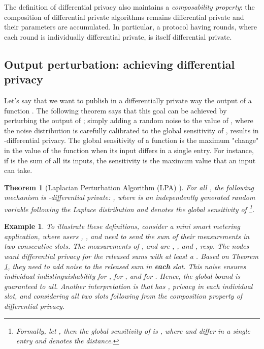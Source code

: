 \documentclass[11pt,a4paper]{article}
\theoremstyle{plain}
\theoremstyle{plain}
\newtheorem{theorem}{Theorem}
\theoremstyle{plain}
\newtheorem{example}{Example}
\theoremstyle{plain}
\theoremstyle{nonumberplain} \theoremseparator{}
\begin{document}
The definition of differential privacy also maintains a \emph{composability property}: the composition of differential private algorithms remains differential private and their  parameters are accumulated. In particular, a protocol having  rounds, where each round is individually  differential private, is itself  differential private.





\subsection{Output perturbation: achieving differential privacy}
\label{sec:perturbation}

Let's say that we want to publish in a differentially private way the output of a function .
The following theorem says that this goal can be achieved by perturbing the output of ; simply adding a random noise to the value of , where the noise distribution is carefully calibrated to the global sensitivity of , results in -differential privacy. The global sensitivity of a function is the maximum "change" in the value of the function when its input differs in a single entry. For instance, if  is the sum of all its inputs, the sensitivity is the maximum value that an input can take.


\begin{theorem}[Laplacian Perturbation Algorithm (LPA) \cite{dwork06tcc}]
\label{thm:histo}
For all , the following mechanism  is -differential private: , where  is an independently generated random variable following the Laplace distribution and  denotes the global sensitivity of \footnote{Formally, let , then the global sensitivity of  is , where  and  differ in a single entry and  denotes the  distance.}.
\end{theorem}





\begin{example}
\label{ex:1}
To illustrate these definitions, consider a mini smart metering application, where users , , and  need to send the sum of their measurements in two consecutive slots. The measurements of ,  and  are , , and , resp. The nodes want differential privacy for the released sums with at least a . Based on Theorem \ref{thm:histo}, they need to add  noise to the released sum in \textbf{each} slot. This noise ensures  individual indistinguishability for ,  for , and  for . Hence, the global  bound is guaranteed to all. Another interpretation is that  has ,  privacy in each individual slot, and  considering all two slots following from the composition property of differential privacy.   
\end{example}
\end{document}
